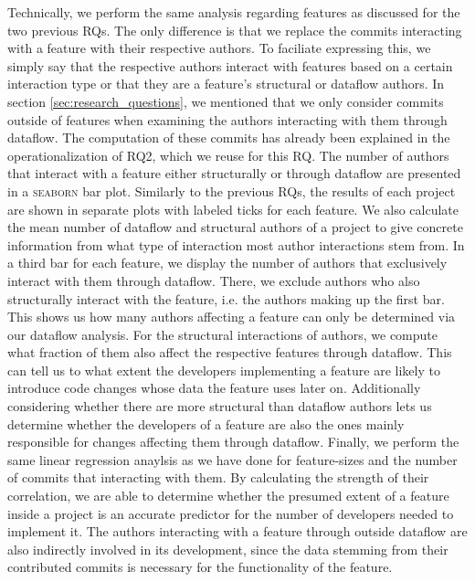 Technically, we perform the same analysis regarding features as discussed for the two previous RQs.
The only difference is that we replace the commits interacting with a feature with their respective authors.
To faciliate expressing this, we simply say that the respective authors interact with features based on a certain interaction type or that they are a feature's structural or dataflow authors.
In section \ref{sec:research_questions}, we mentioned that we only consider commits outside of features when examining the authors interacting with them through dataflow.
The computation of these commits has already been explained in the operationalization of RQ2, which we reuse for this RQ.
The number of authors that interact with a feature either structurally or through dataflow are presented in a \textsc{seaborn} bar plot.
Similarly to the previous RQs, the results of each project are shown in separate plots with labeled ticks for each feature.
We also calculate the mean number of dataflow and structural authors of a project to give concrete information from what type of interaction most author interactions stem from.
In a third bar for each feature, we display the number of authors that exclusively interact with them through dataflow.
There, we exclude authors who also structurally interact with the feature, i.e. the authors making up the first bar.
This shows us how many authors affecting a feature can only be determined via our dataflow analysis.
For the structural interactions of authors, we compute what fraction of them also affect the respective features through dataflow.
This can tell us to what extent the developers implementing a feature are likely to introduce code changes whose data the feature uses later on.
Additionally considering whether there are more structural than dataflow authors lets us determine whether the developers of a feature are also the ones mainly responsible for changes affecting them through dataflow.
Finally, we perform the same linear regression anaylsis as we have done for feature-sizes and the number of commits that interacting with them.
By calculating the strength of their correlation, we are able to determine whether the presumed extent of a feature inside a project is an accurate predictor for the number of developers needed to implement it.
The authors interacting with a feature through outside dataflow are also indirectly involved in its development, since the data stemming from their contributed commits is necessary for the functionality of the feature.
